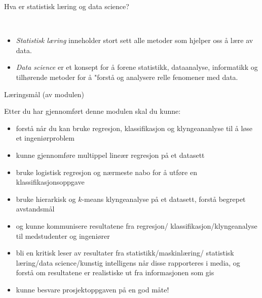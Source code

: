\documentclass[10pt,ignorenonframetext,]{beamer}
\providecommand{\tightlist}{%
  \setlength{\itemsep}{0pt}\setlength{\parskip}{0pt}}
\begin{document}
\begin{frame}{Hva er statistisk læring og data science?}
\protect\hypertarget{hva-er-statistisk-luxe6ring-og-data-science}{}

\(~\)

\begin{itemize}
\tightlist
\item
  \emph{Statistisk læring} inneholder stort sett alle metoder som
  hjelper oss å lære av data.
\end{itemize}

\vspace{2mm}

\begin{itemize}
\tightlist
\item
  \emph{Data science} er et konsept for å forene statistikk,
  dataanalyse, informatikk og tilhørende metoder for å "forstå og
  analysere relle fenomener med data.
\end{itemize}

\end{frame}

\begin{frame}{Læringsmål (av modulen)}
\protect\hypertarget{luxe6ringsmuxe5l-av-modulen}{}

Etter du har gjennomført denne modulen skal du kunne:

\begin{itemize}
\item
  forstå når du kan bruke regresjon, klassifikasjon og klyngeananlyse
  til å løse et ingeniørproblem
\item
  kunne gjennomføre multippel lineær regresjon på et datasett
\item
  bruke logistisk regresjon og nærmeste nabo for å utføre en
  klassifikasjonsoppgave
\item
  bruke hierarkisk og \(k\)-means klyngeanalyse på et datasett, forstå
  begrepet avstandsmål
\item
  og kunne kommunisere resultatene fra regresjon/
  klassifikasjon/klyngeanalyse til medstudenter og ingeniører
\item
  bli en kritisk leser av resultater fra statistikk/maskinlæring/
  statistisk læring/data science/kunstig intelligens når disse
  rapporteres i media, og forstå om resultatene er realistiske ut fra
  informasjonen som gis
\item
  kunne besvare prosjektoppgaven på en god måte!
\end{itemize}

\end{frame}
\end{document}
